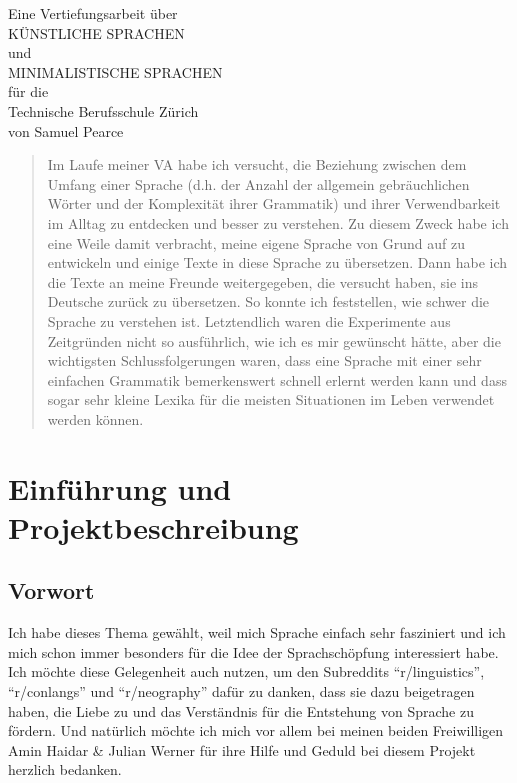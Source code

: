 \documentclass{article}
\begin{document}
\graphicspath{ {../images/} }

%

\begingroup
\centering
\vfill
\Large{Eine Vertiefungsarbeit über}\\
\Huge{KÜNSTLICHE SPRACHEN}\\
\huge{und}\\
\huge{MINIMALISTISCHE SPRACHEN}\\
\large{für die}\\
\Large{Technische Berufsschule Zürich}\\
\vspace{3cm}
\Large{von Samuel Pearce}\\
\vfill\null
\endgroup
\thispagestyle{empty}

\begin{abstract}
    Im Laufe meiner VA habe ich versucht, die Beziehung zwischen dem Umfang einer Sprache
    (d.h. der Anzahl der allgemein gebräuchlichen Wörter und der Komplexität ihrer Grammatik)
    und ihrer Verwendbarkeit im Alltag zu entdecken und besser zu verstehen.
    Zu diesem Zweck habe ich eine Weile damit verbracht, meine eigene Sprache von Grund auf zu
    entwickeln und einige Texte in diese Sprache zu übersetzen. Dann habe ich die Texte an meine
    Freunde weitergegeben, die versucht haben, sie ins Deutsche zurück zu übersetzen.
    So konnte ich feststellen, wie schwer die Sprache zu verstehen ist.
    Letztendlich waren die Experimente aus Zeitgründen nicht so ausführlich,
    wie ich es mir gewünscht hätte, aber die wichtigsten Schlussfolgerungen waren,
    dass eine Sprache mit einer sehr einfachen Grammatik bemerkenswert schnell erlernt
    werden kann und dass sogar sehr kleine Lexika für die meisten Situationen im Leben verwendet werden können.
\end{abstract}
\pagebreak

\tableofcontents
\pagebreak




\section{Einführung und Projektbeschreibung}
\subsection{Vorwort}
Ich habe dieses Thema gewählt, weil mich Sprache einfach sehr fasziniert und ich mich schon immer besonders
für die Idee der Sprachschöpfung interessiert habe. Ich möchte diese Gelegenheit auch nutzen,
um den Subreddits ``r/linguistics'', ``r/conlangs'' und ``r/neography'' dafür zu danken, dass sie dazu beigetragen haben,
die Liebe zu und das Verständnis für die Entstehung von Sprache zu fördern.
Und natürlich möchte ich mich vor allem bei meinen beiden Freiwilligen Amin Haidar \& Julian Werner
für ihre Hilfe und Geduld bei diesem Projekt herzlich bedanken.
\end{document}
